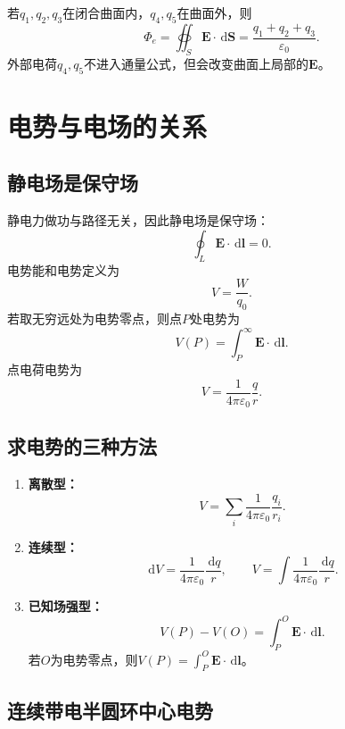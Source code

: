 \documentclass[UTF8,zihao=-4]{ctexart}
\newcommand{\dd}{\,\mathrm d}
\newcommand{\epsz}{\varepsilon_0}
\newcommand{\ve}[1]{\bm{#1}}
\newcommand{\E}{\ve E}
\newcommand{\dl}{\dd\ve l}
\newcommand{\dS}{\dd\ve S}
\begin{document}
\begin{examplebox}
若\(q_1,q_2,q_3\)在闭合曲面内，\(q_4,q_5\)在曲面外，则
\[
\Phi_e=\oiint_S\E\cdot\dS=\frac{q_1+q_2+q_3}{\epsz}.
\]
外部电荷\(q_4,q_5\)不进入通量公式，但会改变曲面上局部的\(\E\)。
\end{examplebox}

\section{电势与电场的关系}

\subsection{静电场是保守场}

静电力做功与路径无关，因此静电场是保守场：
\begin{equation}
\oint_L \E\cdot\dl=0.
\end{equation}
电势能和电势定义为
\begin{equation}
V=\frac{W}{q_0}.
\end{equation}
若取无穷远处为电势零点，则点\(P\)处电势为
\begin{equation}
V(P)=\int_P^{\infty}\E\cdot\dl.
\end{equation}
点电荷电势为
\begin{equation}
\boxed{V=\frac{1}{4\pi\epsz}\frac{q}{r}}.
\end{equation}

\subsection{求电势的三种方法}

\begin{keybox}[求电势三种类型]
\begin{enumerate}
  \item \textbf{离散型：}
  \[
  V=\sum_i \frac{1}{4\pi\epsz}\frac{q_i}{r_i}.
  \]
  \item \textbf{连续型：}
  \[
  \dd V=\frac{1}{4\pi\epsz}\frac{\dd q}{r},\qquad
  V=\int \frac{1}{4\pi\epsz}\frac{\dd q}{r}.
  \]
  \item \textbf{已知场强型：}
  \[
  V(P)-V(O)=\int_P^O \E\cdot\dl.
  \]
  若\(O\)为电势零点，则\(V(P)=\int_P^O\E\cdot\dl\)。
\end{enumerate}
\end{keybox}

\subsection{连续带电半圆环中心电势}
\end{document}
